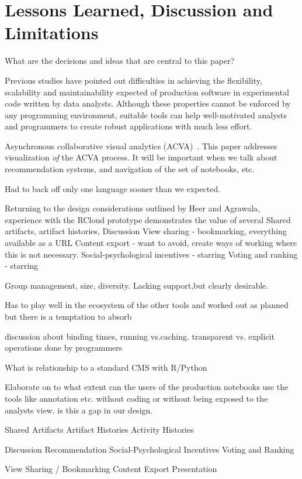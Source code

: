 \section{Lessons Learned, Discussion and Limitations}

What are the decisions and ideas that are central to this paper?

Previous studies have pointed out difficulties in achieving the flexibility,
scalability and maintainability expected of production software in experimental
code written by data analysts.
Although these properties cannot be enforced by any programming environment,
suitable tools can help well-motivated analysts and programmers to create
robust applications with much less effort.

Asynchronous collaborative visual analytics
(ACVA)~\cite{Chen:2011:SEC}. This paper addresses visualization
\emph{of} the ACVA process. It will be important when we talk about
recommendation systems, and navigation of the set of notebooks, etc.

Had to back off only one language sooner than we expected.

Returning to the design considerations outlined by Heer and Agrawala, experience with the RCloud prototype demonstrates the value of several
Shared artifacts, artifact histories,
Discussion
View sharing - bookmarking, everything available as a URL
Content export - want to avoid, create ways of working where this is not necessary.
Social-psychological incentives - starring
Voting and ranking - starring

Group management, size, diversity.  Lacking support,but clearly desirable.

Has to play well in the ecosystem of the other tools and worked out as planned but there is a temptation to absorb

discussion about binding times, running vs.caching.
transparent vs. explicit operations done by programmers

What is relationship to a standard CMS with R/Python

Elaborate on to what extent can the users of the production notebooks use the tools like annotation etc. without coding or without being exposed to the analysts view. is this a gap in our design.

Shared Artifacts
Artifact Histories
Activity Histories


Discussion
Recommendation
Social-Psychological Incentives
Voting and Ranking


View Sharing / Bookmarking
Content Export
Presentation
